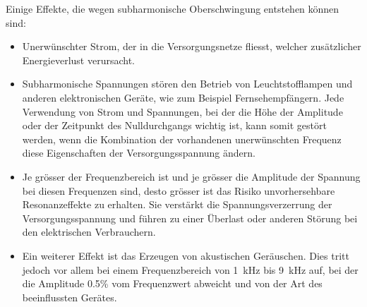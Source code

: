 Einige Effekte, die wegen subharmonische Oberschwingung entstehen können sind:
\begin{itemize}
	\item Unerwünschter Strom, der in die Versorgungsnetze fliesst, welcher zusätzlicher Energieverlust verursacht.
	\item Subharmonische Spannungen stören den Betrieb von Leuchtstofflampen und anderen elektronischen Geräte, wie zum Beispiel Fernsehempfängern. Jede Verwendung von Strom und Spannungen, bei der die Höhe der Amplitude oder der Zeitpunkt des Nulldurchgangs wichtig ist, kann somit gestört werden, wenn die Kombination der vorhandenen unerwünschten Frequenz diese Eigenschaften der Versorgungsspannung ändern.
	\item Je grösser der Frequenzbereich ist und je grösser die Amplitude der Spannung bei diesen Frequenzen sind, desto grösser ist das Risiko unvorhersehbare Resonanzeffekte zu erhalten. Sie verstärkt die Spannungsverzerrung der Versorgungsspannung und führen zu einer Überlast oder anderen Störung bei den elektrischen Verbrauchern.
	\item Ein weiterer Effekt ist das Erzeugen von akustischen Geräuschen. Dies tritt jedoch vor allem bei einem Frequenzbereich von \SI{1}{kHz} bis \SI{9}{kHz} auf, bei der die Amplitude 0.5\% vom Frequenzwert abweicht und von der Art des beeinflussten Gerätes.
\end{itemize}





        
